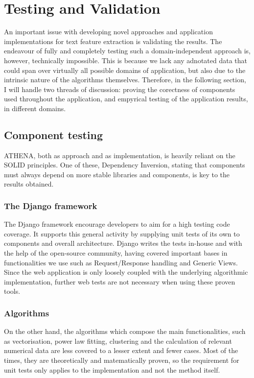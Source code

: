 \documentclass[12pt,a4paper,twoside]{report}
\begin{document}

\newpage

\listoffigures
\tableofcontents
\newpage









\chapter{Testing and Validation}
An important issue with developing novel approaches and application implementations for text feature extraction is validating the results. The endeavour of fully and completely testing such a domain-independent approach is, however, technically impossible. This is because we lack any adnotated data that could span over virtually all possible domains of application, but also due to the intrinsic nature of the algorithms themselves. Therefore, in the following section, I will handle two threads of discussion: proving the corectness of components used throughout the application, and empyrical testing of the application results, in different domains.

\section{Component testing}
ATHENA, both as approach and as implementation, is heavily reliant on the SOLID principles. One of these, Dependency Inversion, stating that components must always depend on more stable libraries and components, is key to the results obtained.

\subsection{The Django framework}
The Django framework encourage developers to aim for a high testing code coverage. It supports this general activity by supplying unit tests of its own to components and overall architecture. Django writes the tests in-house and with the help of the open-source community, having covered important bases in functionalities we use such as Request/Response handling and Generic Views. Since the web application is only loosely coupled with the underlying algorithmic implementation, further web tests are not necessary when using these proven tools.

\subsection{Algorithms}
On the other hand, the algorithms which compose the main functionalities, such as vectorisation, power law fitting, clustering and the calculation of relevant numerical data are less covered to a lesser extent and fewer cases. Most of the times, they are theoretically and matematically proven, so the requirement for unit tests only applies to the implementation and not the method itself.
\end{document}
